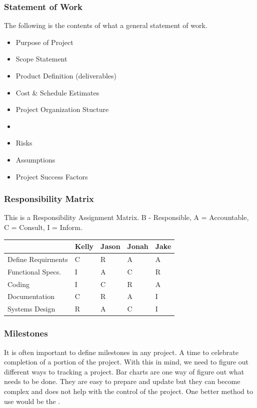 \documentclass[english, 11pt]{article}
\begin{document}
      \subsubsection{Statement of Work}
        The following is the contents of what a general statement of work.
        \begin{itemize}
          \item Purpose of Project
          \item Scope Statement
          \item Product Definition (deliverables)
          \item Cost \& Schedule Estimates
          \item Project Organization Stucture
          \item {}
          \item Risks
          \item Assumptions
          \item Project Success Factors
        \end{itemize}
      
      \subsubsection{Responsibility Matrix }\label{ram}

      \begin{exmp}
      This is a Responsibility Assignment Matrix. B - Responsible, A = Accountable, C = Consult, I = Inform.
      \begin{center}
        \begin{tabular}{|l|l|l|l|l|}
          \hline
          ~                  & Kelly & Jason & Jonah & Jake \\ \hline
          Define Requirments & C     & R     & A     & A    \\
          Functional Specs.  & I     & A     & C     & R    \\
          Coding             & I     & C     & R     & A    \\
          Documentation      & C     & R     & A     & I    \\
          Systems Design     & R     & A     & C     & I    \\ \hline
        \end{tabular}
      \end{center}
      \end{exmp}
      
      \subsubsection{Milestones}
        It is often important to define milestones in any project. A time to celebrate completion of a portion of the project. With this in mind, we need to figure out different ways to tracking a project. Bar charts are one way of figure out what needs to be done. They are easy to prepare and update but they can become complex and does not help with the control of the project. One better method to use would be the .
\end{document}
